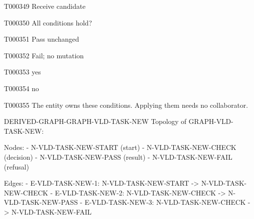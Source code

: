 \documentclass[11pt,a4paper]{article}
\begin{document}
\begin{atlastext}{T000349}
Receive candidate
\end{atlastext}
\begin{atlastext}{T000350}
All conditions hold?
\end{atlastext}
\begin{atlastext}{T000351}
Pass unchanged
\end{atlastext}
\begin{atlastext}{T000352}
Fail; no mutation
\end{atlastext}
\begin{atlastext}{T000353}
yes
\end{atlastext}
\begin{atlastext}{T000354}
no
\end{atlastext}
\begin{atlasparagraph}{T000355}
The entity owns these conditions. Applying them needs no collaborator.
\end{atlasparagraph}
\par\noindent\begin{minipage}{\linewidth}
\begin{atlasderived}{DERIVED-GRAPH-GRAPH-VLD-TASK-NEW}
Topology of GRAPH-VLD-TASK-NEW:

Nodes:
- N-VLD-TASK-NEW-START (start)
- N-VLD-TASK-NEW-CHECK (decision)
- N-VLD-TASK-NEW-PASS (result)
- N-VLD-TASK-NEW-FAIL (refusal)

Edges:
- E-VLD-TASK-NEW-1: N-VLD-TASK-NEW-START -> N-VLD-TASK-NEW-CHECK
- E-VLD-TASK-NEW-2: N-VLD-TASK-NEW-CHECK -> N-VLD-TASK-NEW-PASS
- E-VLD-TASK-NEW-3: N-VLD-TASK-NEW-CHECK -> N-VLD-TASK-NEW-FAIL
\end{atlasderived}
\end{minipage}\par
\end{document}

